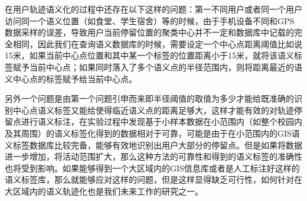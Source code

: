 \par 在用户轨迹语义化的过程中还存在以下这样的问题：第一不同用户或者同一个用户访问同一个语义位置（如食堂、学生宿舍）等的时候，由于手机设备不同和GPS数据采样的误差，导致用户当前停留位置的聚类中心并不一定和数据库中记载的完全相同，因此我们在查询语义数据库的时候，需要设定一个中心点距离阈值比如说15米，如果当前中心点位置和其中某一个标签的位置距离小于15米，就将该语义标签赋予当前中心点；如果同时落入了多个语义点的半径范围内，则将距离最近的语义中心点的标签赋予给当前中心点。
\par 另外一个问题是由第一个问题引申而来即半径阈值的取值为多少才能给既准确的识别中心点语义标签又能给使得临近语义点的距离足够大，这样才能有效的对轨迹停留点进行语义标注，在实验过程中发现基于小样本数据在小范围内（如整个校园内及其周围）的语义标签化得到的数据相对于可靠，可能是由于在小范围内的GIS语义标签数据库比较完备，能够有效地识别出用户大部分的停留点。但是如果将数据进一步增加，将活动范围扩大，那么这种方法的可靠性和得到的语义标签的准确性也将受到影响。如果能够得到一个大区域内的GIS信息库或者是人工标注好这样的语义标签库，那么就能够应对这样的问题，但是这样显得缺乏可行性，如何针对在大区域内的语义轨迹化也是我们未来工作的研究之一。
